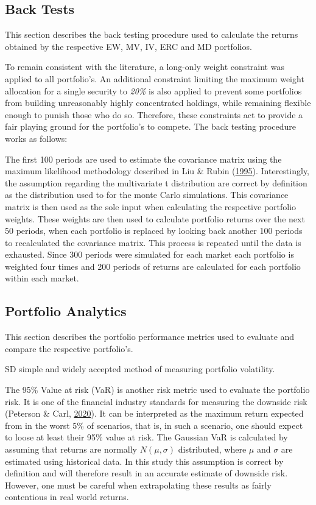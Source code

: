 \documentclass[11pt,preprint, authoryear]{elsarticle}
\numberwithin{equation}{section}
\numberwithin{figure}{section}
\numberwithin{table}{section}
\begin{document}
\hypertarget{back-tests}{%
\subsection{Back Tests}\label{back-tests}}

This section describes the back testing procedure used to calculate the
returns obtained by the respective EW, MV, IV, ERC and MD portfolios.

To remain consistent with the literature, a long-only weight constraint
was applied to all portfolio's. An additional constraint limiting the
maximum weight allocation for a single security to \emph{20\%} is also
applied to prevent some portfolios from building unreasonably highly
concentrated holdings, while remaining flexible enough to punish those
who do so. Therefore, these constraints act to provide a fair playing
ground for the portfolio's to compete. The back testing procedure works
as follows:

The first 100 periods are used to estimate the covariance matrix using
the maximum likelihood methodology described in Liu \& Rubin
(\protect\hyperlink{ref-liu1995}{1995}). Interestingly, the assumption
regarding the multivariate t distribution are correct by definition as
the distribution used to for the monte Carlo simulations. This
covariance matrix is then used as the sole input when calculating the
respective portfolio weights. These weights are then used to calculate
portfolio returns over the next 50 periods, when each portfolio is
replaced by looking back another 100 periods to recalculated the
covariance matrix. This process is repeated until the data is exhausted.
Since 300 periods were simulated for each market each portfolio is
weighted four times and 200 periods of returns are calculated for each
portfolio within each market.

\hypertarget{portfolio-analytics}{%
\subsection{Portfolio Analytics}\label{portfolio-analytics}}

This section describes the portfolio performance metrics used to
evaluate and compare the respective portfolio's.

SD simple and widely accepted method of measuring portfolio volatility.

The 95\% Value at risk (VaR) is another risk metric used to evaluate the
portfolio risk. It is one of the financial industry standards for
measuring the downside risk (Peterson \& Carl,
\protect\hyperlink{ref-PerformanceAnalytics}{2020}). It can be
interpreted as the maximum return expected from in the worst 5\% of
scenarios, that is, in such a scenario, one should expect to loose at
least their 95\% value at risk. The Gaussian VaR is calculated by
assuming that returns are normally \(N(\mu,\sigma)\) distributed, where
\(\mu\) and \(\sigma\) are estimated using historical data. In this
study this assumption is correct by definition and will therefore result
in an accurate estimate of downside risk. However, one must be careful
when extrapolating these results as fairly contentious in real world
returns.
\end{document}

